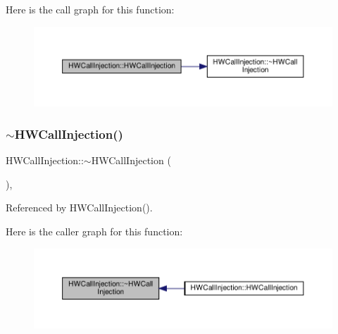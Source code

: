Here is the call graph for this function\+:
\nopagebreak
\begin{figure}[H]
\begin{center}
\leavevmode
\includegraphics[width=350pt]{d8/d90/classHWCallInjection_aef59f1a3976f0b57603584279d628446_cgraph}
\end{center}
\end{figure}
\mbox{\label{classHWCallInjection_a751bfc91e0841555708f977dfe7398aa}} 
\subsubsection{\texorpdfstring{$\sim$\+H\+W\+Call\+Injection()}{~HWCallInjection()}}
{\footnotesize\ttfamily H\+W\+Call\+Injection\+::$\sim$\+H\+W\+Call\+Injection (\begin{DoxyParamCaption}{ }\end{DoxyParamCaption})\hspace{0.3cm}{\ttfamily [override]}, {\ttfamily [default]}}



Referenced by H\+W\+Call\+Injection().

Here is the caller graph for this function\+:
\nopagebreak
\begin{figure}[H]
\begin{center}
\leavevmode
\includegraphics[width=350pt]{d8/d90/classHWCallInjection_a751bfc91e0841555708f977dfe7398aa_icgraph}
\end{center}
\end{figure}


